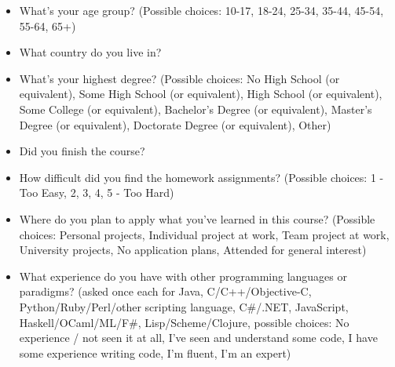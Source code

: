 \documentclass{sig-alternate}
\begin{document}
\begin{itemize}

\item What's your age group? (Possible choices: 10-17, 18-24, 25-34, 35-44,
  45-54, 55-64, 65+)

\item What country do you live in?

\item What's your highest degree? (Possible choices: No High School (or equivalent), Some High
  School (or equivalent), High School (or equivalent), Some College (or equivalent), Bachelor's
  Degree (or equivalent), Master's Degree (or equivalent), Doctorate Degree (or equivalent),
  Other)

\item Did you finish the course?

\item How difficult did you find the homework assignments? (Possible choices: 1 - Too Easy, 2,
  3, 4, 5 - Too Hard)

\item Where do you plan to apply what you've learned in this course? (Possible choices:
  Personal projects, Individual project at work, Team project at work, University projects, No
  application plans, Attended for general interest)

\item What experience do you have with other programming languages or paradigms? (asked once
  each for Java, C/C++/Objective-C, Python/Ruby/Perl/other scripting language, C\#/.NET,
  JavaScript, \\Haskell/OCaml/ML/F\#, Lisp/Scheme/Clojure, possible choices: No experience /
  not seen it at all, I've seen and understand some code, I have some experience writing code,
  I'm fluent, I'm an expert)

\end{itemize}

\end{document}
